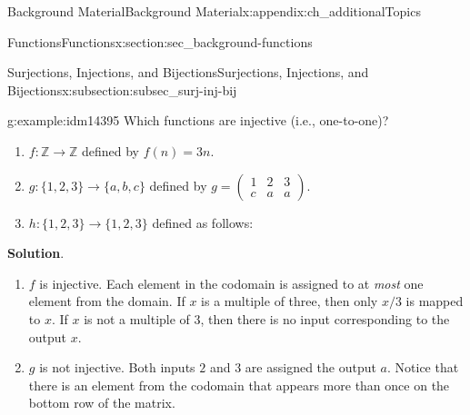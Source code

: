 \documentclass[oneside,10pt,]{book}
\numberwithin{equation}{chapter}
\def\Z{\mathbb Z}
\newcommand{\amp}{&}
\begin{document}
\begin{appendixptx}{Background Material}{}{Background Material}{}{}{x:appendix:ch_additionalTopics}
\begin{sectionptx}{Functions}{}{Functions}{}{}{x:section:sec_background-functions}
\begin{subsectionptx}{Surjections, Injections, and Bijections}{}{Surjections, Injections, and Bijections}{}{}{x:subsection:subsec_surj-inj-bij}
\begin{sidebyside}{2}{0.05}{0.05}{0.1}
\begin{sbspanel}{0.4}%
%
\end{sbspanel}%
\end{sidebyside}%
\begin{example}{}{g:example:idm14395}%
Which functions are injective (i.e., one-to-one)?%
\par
%
\begin{enumerate}
\item{}\(f:\Z \to \Z\) defined by \(f(n) = 3n\).%
\item{}\(g: \{1,2,3\} \to \{a,b,c\}\) defined by \(g = \begin{pmatrix}1 \amp 2 \amp 3 \\ c \amp a \amp a \end{pmatrix}\).%
\item{}\(h:\{1,2,3\} \to \{1,2,3\}\) defined as follows:%
\begin{sidebyside}{1}{0.4}{0.4}{0}%
\begin{sbspanel}{0.2}%
%
\end{sbspanel}%
\end{sidebyside}%
\end{enumerate}
%
\par\smallskip%
\noindent\textbf{Solution}.\hypertarget{g:solution:idm14412}{}\quad{}%
\begin{enumerate}
\item{}\(f\) is injective. Each element in the codomain is assigned to at \emph{most} one element from the domain. If \(x\) is a multiple of three, then only \(x/3\) is mapped to \(x\). If \(x\) is not a multiple of 3, then there is no input corresponding to the output \(x\).%
\item{}\(g\) is not injective. Both inputs \(2\) and \(3\) are assigned the output \(a\). Notice that there is an element from the codomain that appears more than once on the bottom row of the matrix.%

\end{enumerate}
\end{example}
\end{subsectionptx}
\end{sectionptx}
\end{appendixptx}
\end{document}
